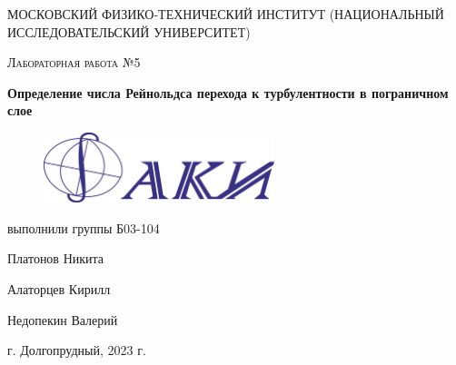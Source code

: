 \begin{titlepage}
	\centering
	\vspace{5cm}
	{\scshape\LARGE МОСКОВСКИЙ ФИЗИКО-ТЕХНИЧЕСКИЙ ИНСТИТУТ (НАЦИОНАЛЬНЫЙ ИССЛЕДОВАТЕЛЬСКИЙ УНИВЕРСИТЕТ)
 \par}
	\vspace{4cm}
	{\scshape\Large Лабораторная работа №5 \par}
	\vspace{1cm}
	{\huge\bfseries Определение числа Рейнольдса перехода к турбулентности в пограничном слое  \par}
\vspace{1cm}
\begin {figure}[H]
\begin{center}
\includegraphics[width=0.6\textwidth]{faki.png}
\end{center}
\end {figure}
\vspace{1cm}
\begin{flushright}
	{\large выполнили 
группы Б03-104}\par
	\vspace{0.3cm}
	{\LARGE Платонов Никита}\par
    \vspace{0.3cm}
    {\LARGE Алаторцев Кирилл}\par
    \vspace{0.3cm}
    {\LARGE Недопекин Валерий}\par
\end{flushright}
	\vfill
	г. Долгопрудный, 2023 г.
\end{titlepage}


